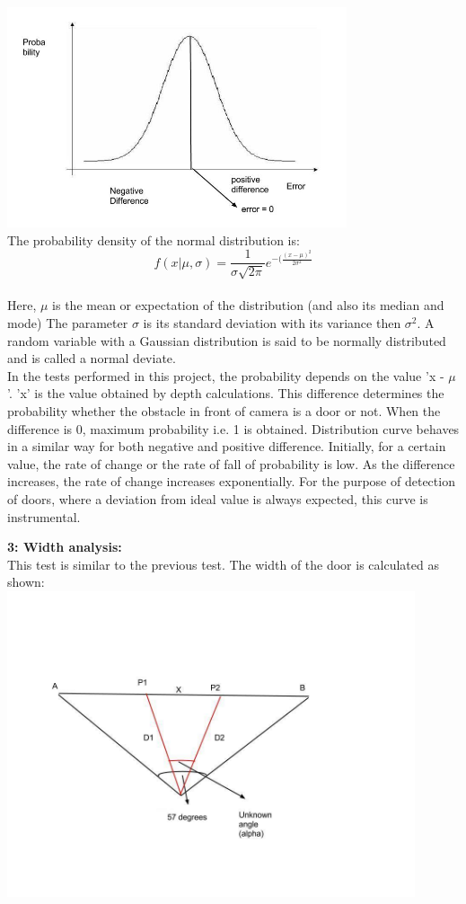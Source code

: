 \documentclass{report}
\begin{document}
\includegraphics[width = 10cm]{Gaussian.jpg} \\
The probability density of the normal distribution is:
\begin{equation}
f(x|\mu,\sigma) = \frac{1}{\sigma\sqrt{2\pi}}e^{-(\frac{(x-\mu)^2}{2\sigma^2}}
\end{equation} \\
Here, $\mu$ is the mean or expectation of the distribution (and also its median and mode)
The parameter $\sigma$ is its standard deviation with its variance then $\sigma^2$. A random variable with a Gaussian distribution 
is said to be normally distributed and is called a normal deviate. \\
In the tests performed in this project, the probability depends on the value 'x - $\mu$'. 'x' is the  value obtained by depth calculations. This difference determines the probability
whether the obstacle in front of camera is a door or not. When the difference is 0, maximum probability i.e. 1 is obtained. Distribution
curve behaves in a similar way for both negative and positive difference. Initially, for a certain value, the rate of change or the rate
of fall of probability is low. As the difference increases, the rate of change increases exponentially. For the purpose of detection of doors, where
a deviation from ideal value is always expected, this curve is instrumental. \\
\pagebreak

\textbf{3: Width analysis:} \\

This test is similar to the previous test. The width of the door is calculated as shown: \\

\includegraphics[width = 12cm]{cosine_modified.jpg}
\end{document}
